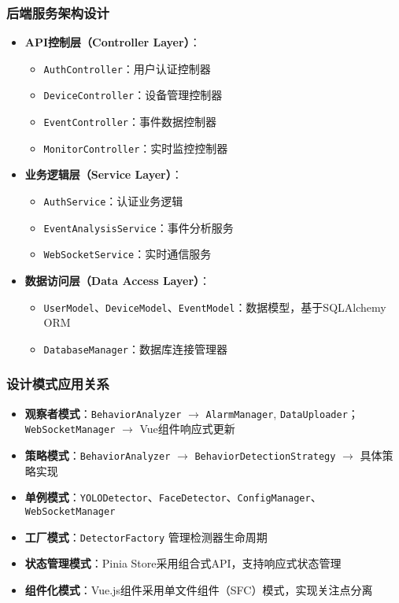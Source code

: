 \documentclass[a4paper,12pt]{article}
\begin{document}
\subsubsection{后端服务架构设计}
\begin{itemize}
  \item \textbf{API控制层（Controller Layer）}：
    \begin{itemize}
      \item \texttt{AuthController}：用户认证控制器
      \item \texttt{DeviceController}：设备管理控制器
      \item \texttt{EventController}：事件数据控制器
      \item \texttt{MonitorController}：实时监控控制器
    \end{itemize}
  \item \textbf{业务逻辑层（Service Layer）}：
    \begin{itemize}
      \item \texttt{AuthService}：认证业务逻辑
      \item \texttt{EventAnalysisService}：事件分析服务
      \item \texttt{WebSocketService}：实时通信服务
    \end{itemize}
  \item \textbf{数据访问层（Data Access Layer）}：
    \begin{itemize}
      \item \texttt{UserModel}、\texttt{DeviceModel}、\texttt{EventModel}：数据模型，基于SQLAlchemy ORM
      \item \texttt{DatabaseManager}：数据库连接管理器
    \end{itemize}
\end{itemize}

\subsubsection{设计模式应用关系}
\begin{itemize}
  \item \textbf{观察者模式}：\texttt{BehaviorAnalyzer} $\to$ \texttt{AlarmManager}, \texttt{DataUploader}；\texttt{WebSocketManager} $\to$ Vue组件响应式更新
  \item \textbf{策略模式}：\texttt{BehaviorAnalyzer} $\to$ \texttt{BehaviorDetectionStrategy} $\to$ 具体策略实现
  \item \textbf{单例模式}：\texttt{YOLODetector}、\texttt{FaceDetector}、\texttt{ConfigManager}、\texttt{WebSocketManager}
  \item \textbf{工厂模式}：\texttt{DetectorFactory} 管理检测器生命周期
  \item \textbf{状态管理模式}：Pinia Store采用组合式API，支持响应式状态管理
  \item \textbf{组件化模式}：Vue.js组件采用单文件组件（SFC）模式，实现关注点分离
\end{itemize}
\end{document}
